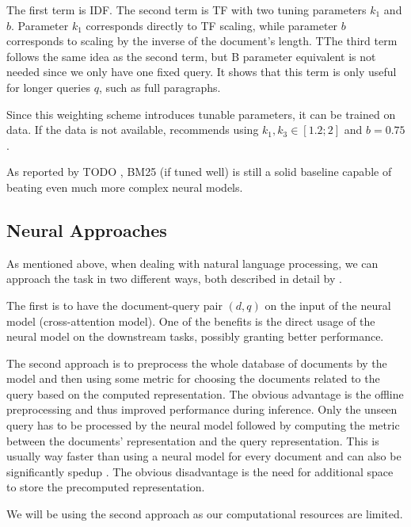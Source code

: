 The first term is IDF.
The second term is TF with two tuning parameters $k_1$ and $b$. Parameter $k_1$ corresponds directly to TF scaling, while parameter $b$ corresponds to scaling by the inverse of the document's length.
TThe third term follows the same idea as the second term, but B parameter equivalent is not needed since we only have one fixed query.
It shows that this term is only useful for longer queries $q$, such as full paragraphs. 

Since this weighting scheme introduces tunable parameters, it can be trained on data. If the data is not available, \citet[Section 11.4.3]{schutze2008introduction} recommends using $k_1, k_3 \in [1.2;2]$ and $b=0.75$.


As reported by TODO \cite{weak-baselines}, BM25 (if tuned well) is still a solid baseline capable of beating even much more complex neural models.

\subsection{Neural Approaches}

As mentioned above, when dealing with natural language processing, we can approach the task in two different ways, both described in detail by \cite{two-tower}. 

The first is to have the document-query pair $(d,q)$ on the input of the neural model (cross-attention model).
One of the benefits is the direct usage of the neural model on the downstream tasks, possibly granting better performance.

The second approach is to preprocess the whole database of documents by the model and then using some metric for choosing the documents related to the query based on the computed representation.
The obvious advantage is the offline preprocessing and thus improved performance during inference.
Only the unseen query has to be processed by the neural model followed by computing the metric between the documents' representation and the query representation.
This is usually way faster than using a neural model for every document and can also be significantly spedup \citep{faiss}.
The obvious disadvantage is the need for additional space to store the precomputed representation.

We will be using the second approach as our computational resources are limited.

